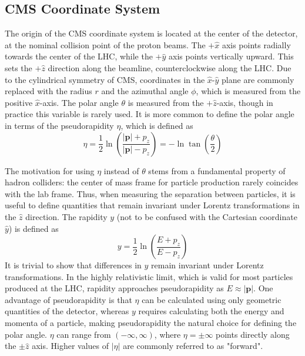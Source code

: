 \subsection{CMS Coordinate System} \label{sec:CMS_coord}
The origin of the CMS coordinate system is located at the center of the detector, at the nominal collision point of the proton beams. The $+\hat{x}$ axis points radially towards the center of the LHC, while the $+\hat{y}$ axis points vertically upward. This sets the $+\hat{z}$ direction along the beamline, counterclockwise along the LHC. Due to the cylindrical symmetry of CMS, coordinates in the $\hat{x}$-$\hat{y}$ plane are commonly replaced with the radius $r$ and the azimuthal angle $\phi$, which is measured from the positive $\hat{x}$-axis. The polar angle $\theta$ is measured from the $+\hat{z}$-axis, though in practice this variable is rarely used. It is more common to define the polar angle in terms of the pseudorapidity $\eta$, which is defined as
\begin{equation}
	\eta=\frac{1}{2}\ln\left(\frac{|\mathbf{p}|+p_{z}}{|\mathbf{p}|-p_{z}}\right)=-\ln{\tan\left(\frac{\theta}{2}\right)}
\end{equation}

The motivation for using $\eta$ instead of $\theta$ stems from a fundamental property of hadron colliders: the center of mass frame for particle production rarely coincides with the lab frame. Thus, when measuring the separation between particles, it is useful to define quantities that remain invariant under Lorentz transformations in the $\hat{z}$ direction. The rapidity $y$ (not to be confused with the Cartesian coordinate $\hat{y}$) is defined as
\begin{equation}
	y=\frac{1}{2}\ln\left(\frac{E+p_{z}}{E-p_{z}}\right)
\end{equation}
It is trivial to show that differences in $y$ remain invariant under Lorentz transformations. In the highly relativistic limit, which is valid for most particles produced at the LHC, rapidity approaches pseudorapidity as $E\approx|\mathbf{p}|$. One advantage of pseudorapidity is that $\eta$ can be calculated using only geometric quantities of the detector, whereas $y$ requires calculating both the energy and momenta of a particle, making pseudorapidity the natural choice for defining the polar angle. $\eta$ can range from $\left(-\infty, \infty\right)$, where $\eta=\pm\infty$ points directly along the $\pm\hat{z}$ axis. Higher values of $\left|\eta\right|$ are commonly referred to as "forward".

